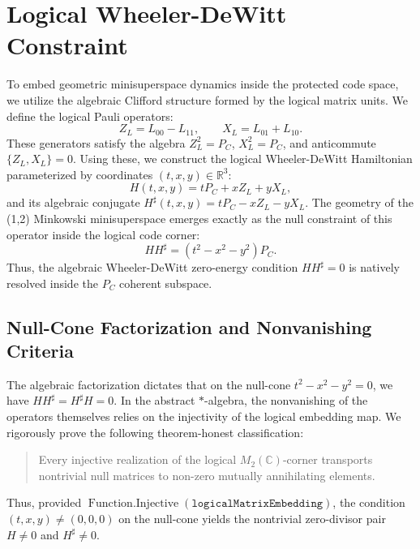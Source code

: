 \documentclass[11pt,a4paper]{article}
\begin{document}
\section{Logical Wheeler-DeWitt Constraint}
To embed geometric minisuperspace dynamics inside the protected code space, we utilize the algebraic Clifford structure formed by the logical matrix units. We define the logical Pauli operators:
\begin{equation}
Z_L = L_{00} - L_{11}, \qquad X_L = L_{01} + L_{10}.
\end{equation}
These generators satisfy the algebra $Z_L^2 = P_C$, $X_L^2 = P_C$, and anticommute $\{Z_L, X_L\} = 0$. Using these, we construct the logical Wheeler-DeWitt Hamiltonian parameterized by coordinates $(t,x,y) \in \mathbb{R}^3$:
\begin{equation}
H(t,x,y) = t P_C + x Z_L + y X_L,
\end{equation}
and its algebraic conjugate $H^\sharp(t,x,y) = t P_C - x Z_L - y X_L$. The geometry of the (1,2) Minkowski minisuperspace emerges exactly as the null constraint of this operator inside the logical code corner:
\begin{equation}
H H^\sharp = (t^2 - x^2 - y^2) P_C.
\end{equation}
Thus, the algebraic Wheeler-DeWitt zero-energy condition $H H^\sharp = 0$ is natively resolved inside the $P_C$ coherent subspace.

\subsection{Null-Cone Factorization and Nonvanishing Criteria}
The algebraic factorization dictates that on the null-cone $t^2 - x^2 - y^2 = 0$, we have $H H^\sharp = H^\sharp H = 0$. In the abstract $*$-algebra, the nonvanishing of the operators themselves relies on the injectivity of the logical embedding map. We rigorously prove the following theorem-honest classification:
\begin{quote}
Every injective realization of the logical $M_2(\mathbb{C})$-corner transports nontrivial null matrices to non-zero mutually annihilating elements.
\end{quote}
Thus, provided $\operatorname{Function.Injective}(\texttt{logicalMatrixEmbedding})$, the condition $(t,x,y) \neq (0,0,0)$ on the null-cone yields the nontrivial zero-divisor pair $H \neq 0$ and $H^\sharp \neq 0$.
\end{document}
